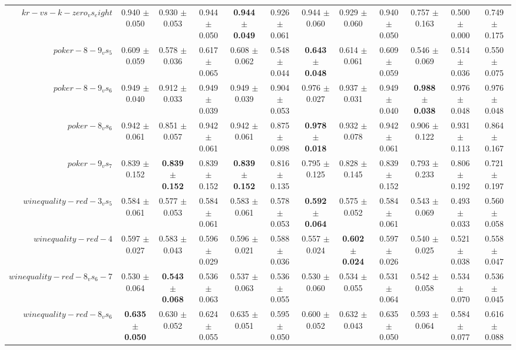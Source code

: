 \begin{table}[!ht]
{\begin{tabular}{r c c c c c c c c c c c}
$kr-vs-k-zero_vs_eight$ & 0.940 $\pm$ 0.050 & 0.930 $\pm$ 0.053 & 0.944 $\pm$ 0.050 & \textbf{0.944 $\pm$ 0.049} & 0.926 $\pm$ 0.061 & 0.944 $\pm$ 0.060 & 0.929 $\pm$ 0.060 & 0.940 $\pm$ 0.050 & 0.757 $\pm$ 0.163 & 0.500 $\pm$ 0.000 & 0.749 $\pm$ 0.175 \\
$poker-8-9_vs_5$ & 0.609 $\pm$ 0.059 & 0.578 $\pm$ 0.036 & 0.617 $\pm$ 0.065 & 0.608 $\pm$ 0.062 & 0.548 $\pm$ 0.044 & \textbf{0.643 $\pm$ 0.048} & 0.614 $\pm$ 0.061 & 0.609 $\pm$ 0.059 & 0.546 $\pm$ 0.069 & 0.514 $\pm$ 0.036 & 0.550 $\pm$ 0.075 \\
$poker-8-9_vs_6$ & 0.949 $\pm$ 0.040 & 0.912 $\pm$ 0.033 & 0.949 $\pm$ 0.039 & 0.949 $\pm$ 0.039 & 0.904 $\pm$ 0.053 & 0.976 $\pm$ 0.027 & 0.937 $\pm$ 0.031 & 0.949 $\pm$ 0.040 & \textbf{0.988 $\pm$ 0.038} & 0.976 $\pm$ 0.048 & 0.976 $\pm$ 0.048 \\
$poker-8_vs_6$ & 0.942 $\pm$ 0.061 & 0.851 $\pm$ 0.057 & 0.942 $\pm$ 0.061 & 0.942 $\pm$ 0.061 & 0.875 $\pm$ 0.098 & \textbf{0.978 $\pm$ 0.018} & 0.932 $\pm$ 0.078 & 0.942 $\pm$ 0.061 & 0.906 $\pm$ 0.122 & 0.931 $\pm$ 0.113 & 0.864 $\pm$ 0.167 \\
$poker-9_vs_7$ & 0.839 $\pm$ 0.152 & \textbf{0.839 $\pm$ 0.152} & 0.839 $\pm$ 0.152 & \textbf{0.839 $\pm$ 0.152} & 0.816 $\pm$ 0.135 & 0.795 $\pm$ 0.125 & 0.828 $\pm$ 0.145 & 0.839 $\pm$ 0.152 & 0.793 $\pm$ 0.233 & 0.806 $\pm$ 0.192 & 0.721 $\pm$ 0.197 \\
$winequality-red-3_vs_5$ & 0.584 $\pm$ 0.061 & 0.577 $\pm$ 0.053 & 0.584 $\pm$ 0.061 & 0.583 $\pm$ 0.061 & 0.578 $\pm$ 0.053 & \textbf{0.592 $\pm$ 0.064} & 0.575 $\pm$ 0.052 & 0.584 $\pm$ 0.061 & 0.543 $\pm$ 0.069 & 0.493 $\pm$ 0.033 & 0.560 $\pm$ 0.058 \\
$winequality-red-4$ & 0.597 $\pm$ 0.027 & 0.583 $\pm$ 0.043 & 0.596 $\pm$ 0.029 & 0.596 $\pm$ 0.021 & 0.588 $\pm$ 0.036 & 0.557 $\pm$ 0.024 & \textbf{0.602 $\pm$ 0.024} & 0.597 $\pm$ 0.026 & 0.540 $\pm$ 0.025 & 0.521 $\pm$ 0.038 & 0.558 $\pm$ 0.047 \\
$winequality-red-8_vs_6-7$ & 0.530 $\pm$ 0.064 & \textbf{0.543 $\pm$ 0.068} & 0.536 $\pm$ 0.063 & 0.537 $\pm$ 0.063 & 0.536 $\pm$ 0.055 & 0.530 $\pm$ 0.060 & 0.534 $\pm$ 0.055 & 0.531 $\pm$ 0.064 & 0.542 $\pm$ 0.058 & 0.534 $\pm$ 0.070 & 0.536 $\pm$ 0.045 \\
$winequality-red-8_vs_6$ & \textbf{0.635 $\pm$ 0.050} & 0.630 $\pm$ 0.052 & 0.624 $\pm$ 0.055 & 0.635 $\pm$ 0.051 & 0.595 $\pm$ 0.050 & 0.600 $\pm$ 0.052 & 0.632 $\pm$ 0.043 & 0.635 $\pm$ 0.050 & 0.593 $\pm$ 0.064 & 0.584 $\pm$ 0.077 & 0.616 $\pm$ 0.088 \\

\end{tabular}}
\end{table}
